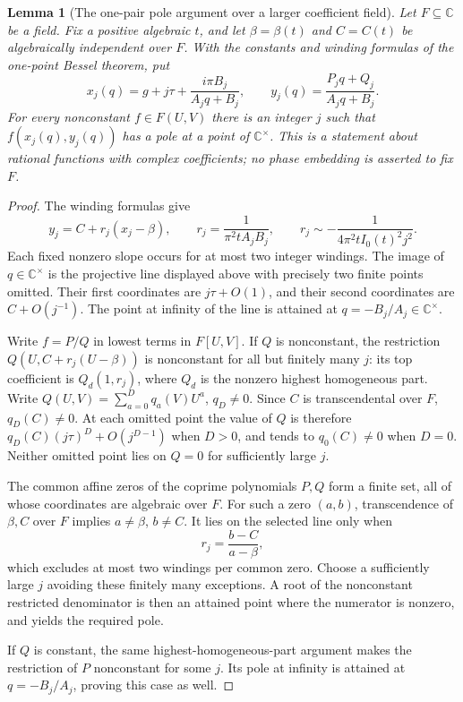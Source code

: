 \documentclass[11pt]{article}
\newtheorem{lemma}[theorem]{Lemma}
\theoremstyle{definition}
\theoremstyle{remark}
\begin{document}
\begin{lemma}[The one-pair pole argument over a larger coefficient field]
\label{mbmulti:onepair}
Let $F\subseteq\mathbb C$ be a field. Fix a positive algebraic $t$,
and let $\beta=\beta(t)$ and $C=C(t)$ be algebraically independent
over $F$. With the constants and winding formulas of the one-point
Bessel theorem, put
\[
 x_j(q)=g+j\tau+\frac{i\pi B_j}{A_jq+B_j},\qquad
 y_j(q)=\frac{P_jq+Q_j}{A_jq+B_j}.
\]
For every nonconstant $f\in F(U,V)$ there is an integer $j$ such that
$f(x_j(q),y_j(q))$ has a pole at a point of $\mathbb C^\times$.
This is a statement about rational functions with complex coefficients;
no phase embedding is asserted to fix $F$.
\end{lemma}
\begin{proof}
The winding formulas give
\[
 y_j=C+r_j(x_j-\beta),\qquad
 r_j=\frac1{\pi^2tA_jB_j},\qquad
 r_j\sim-\frac1{4\pi^2tI_0(t)^2j^2}.
\]
Each fixed nonzero slope occurs for at most two integer windings.
The image of $q\in\mathbb C^\times$ is the projective line displayed
above with precisely two finite points omitted. Their first coordinates
are $j\tau+O(1)$, and their second coordinates are $C+O(j^{-1})$.
The point at infinity of the line is attained at
$q=-B_j/A_j\in\mathbb C^\times$.

Write $f=P/Q$ in lowest terms in $F[U,V]$. If $Q$ is nonconstant,
the restriction $Q(U,C+r_j(U-\beta))$ is nonconstant for all but
finitely many $j$: its top coefficient is $Q_d(1,r_j)$, where $Q_d$
is the nonzero highest homogeneous part. Write
$Q(U,V)=\sum_{a=0}^Dq_a(V)U^a$, $q_D\ne0$. Since $C$ is
transcendental over $F$, $q_D(C)\ne0$. At each omitted point the
value of $Q$ is therefore $q_D(C)(j\tau)^D+O(j^{D-1})$ when
$D>0$, and tends to $q_0(C)\ne0$ when $D=0$. Neither omitted point
lies on $Q=0$ for sufficiently large $j$.

The common affine zeros of the coprime polynomials $P,Q$ form a finite
set, all of whose coordinates are algebraic over $F$. For such a zero
$(a,b)$, transcendence of $\beta,C$ over $F$ implies
$a\ne\beta$, $b\ne C$. It lies on the selected line only when
\[
 r_j=\frac{b-C}{a-\beta},
\]
which excludes at most two windings per common zero. Choose a sufficiently
large $j$ avoiding these finitely many exceptions. A root of the
nonconstant restricted denominator is then an attained point where the
numerator is nonzero, and yields the required pole.

If $Q$ is constant, the same highest-homogeneous-part argument makes
the restriction of $P$ nonconstant for some $j$. Its pole at infinity
is attained at $q=-B_j/A_j$, proving this case as well.
\end{proof}
\end{document}

